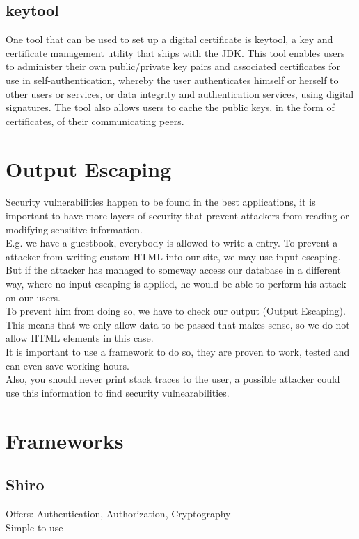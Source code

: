 \documentclass[12pt,a4paper]{report}
\begin{document}
\section{keytool}
One tool that can be used to set up a digital certificate is keytool, a key and certificate management utility that ships with the JDK. This tool enables users to administer their own public/private key pairs and associated certificates for use in self-authentication, whereby the user authenticates himself or herself to other users or services, or data integrity and authentication services, using digital signatures. The tool also allows users to cache the public keys, in the form of certificates, of their communicating peers.

\chapter{Output Escaping}
Security vulnerabilities happen to be found in the best applications, it is important to have more layers of security that prevent attackers from reading or modifying sensitive information.\\
E.g. we have a guestbook, everybody is allowed to write a entry. To prevent a attacker from writing custom HTML into our site, we may use input escaping. But if the attacker has managed to someway access our database in a different way, where no input escaping is applied, he would be able to perform his attack on our users.\\
To prevent him from doing so, we have to check our output (Output Escaping). This means that we only allow data to be passed that makes sense, so we do not allow HTML elements in this case.\\
It is important to use a framework to do so, they are proven to work, tested and can even save working hours.\\
Also, you should never print stack traces to the user, a possible attacker could use this information to find security vulnearabilities.

\chapter{Frameworks}
\section{Shiro}
Offers: Authentication, Authorization, Cryptography\\
Simple to use\\\\
\end{document}
